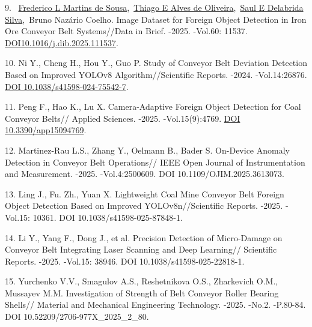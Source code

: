 \begin{refs}
9. ~\href{https://pubmed.ncbi.nlm.nih.gov/?term=Martins+de+Sousa+FL&cauthor_id=40534719}{Frederico
L Martins de
Sousa}\tsp{~},~\href{https://pubmed.ncbi.nlm.nih.gov/?term=Alves+de+Oliveira+TE&cauthor_id=40534719}{Thiago
E Alves de
Oliveira}\tsp{~},~\href{https://pubmed.ncbi.nlm.nih.gov/?term=Delabrida+Silva+SE&cauthor_id=40534719}{Saul
E Delabrida Silva}\tsp{~},~Bruno Nazário Coelho. Image
Dataset for Foreign Object Detection in Iron Ore Conveyor Belt
Systems//Data in Brief. -2025. -Vol.60: 11537.
\href{https://doi.org/10.1016/j.dib.2025.111537}{DOI10.1016/j.dib.2025.111537}.

10. Ni Y., Cheng H., Hou Y., Guo P. Study of Conveyor Belt Deviation
Detection Based on Improved YOLOv8 Algorithm//Scientific Reports. -2024.
-Vol.14:26876. \href{https://doi.org/10.1038/s41598-024-75542-7}{DOI
10.1038/s41598-024-75542-7}.

11. Peng F., Hao K., Lu X. Camera-Adaptive Foreign Object Detection for
Coal Conveyor Belts// Applied Sciences. -2025. -Vol.15(9):4769.
\href{https://doi.org/10.3390/app15094769}{DOI 10.3390/app15094769}.

12. Martinez-Rau L.S., Zhang Y., Oelmann B., Bader S. On-Device Anomaly
Detection in Conveyor Belt Operations// IEEE Open Journal of
Instrumentation and Measurement. -2025. -Vol.4:2500609. DOI
10.1109/OJIM.2025.3613073.

13. Ling J., Fu. Zh., Yuan X. Lightweight Coal Mine Conveyor Belt
Foreign Object Detection Based on Improved YOLOv8n//Scientific Reports.
-2025. -Vol.15: 10361. DOI 10.1038/s41598-025-87848-1.

14. Li Y., Yang F., Dong J., et al. Precision Detection of Micro-Damage
on Conveyor Belt Integrating Laser Scanning and Deep Learning//
Scientific Reports. -2025. -Vol.15: 38946. DOI
10.1038/s41598-025-22818-1.

15. Yurchenko V.V., Smagulov A.S., Reshetnikova O.S., Zharkevich O.M.,
Mussayev M.M. Investigation of Strength of Belt Conveyor Roller Bearing
Shells// Material and Mechanical Engineering Technology. -2025. -No.2.
-P.80-84. DOI 10.52209/2706-977X\_2025\_2\_80.
\end{refs}

